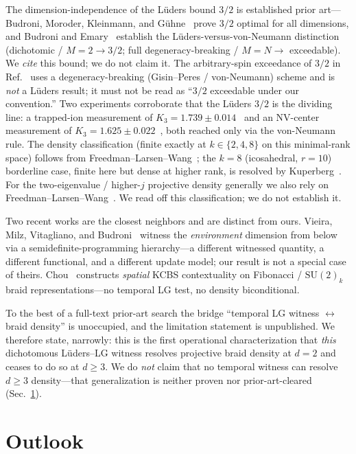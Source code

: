 \documentclass[aps,prx,reprint,amsmath,amssymb,floatfix,nofootinbib,superscriptaddress]{revtex4-2}
\begin{document}
The dimension-independence of the L\"uders bound $3/2$ is established prior
art---Budroni, Moroder, Kleinmann, and G\"uhne~\cite{BMKG} prove $3/2$ optimal for all
dimensions, and Budroni and Emary~\cite{BE} establish the L\"uders-versus-von-Neumann
distinction (dichotomic / $M=2 \to 3/2$; full degeneracy-breaking / $M=N \to$
exceedable). We \emph{cite} this bound; we do not claim it. The arbitrary-spin
exceedance of $3/2$ in Ref.~\cite{MM} uses a degeneracy-breaking (Gisin--Peres /
von-Neumann) scheme and is \emph{not} a L\"uders result; it must not be read as
``$3/2$ exceedable under our convention.'' Two experiments corroborate that the
L\"uders $3/2$ is the dividing line: a trapped-ion measurement of
$K_3 = 1.739 \pm 0.014$~\cite{TrappedIon2023} and an NV-center measurement of
$K_3 = 1.625 \pm 0.022$~\cite{NV2022}, both reached only via the von-Neumann rule. The density
classification (finite exactly at $k \in \{2,4,8\}$ on this minimal-rank space)
follows from Freedman--Larsen--Wang~\cite{FLW}; the $k=8$ (icosahedral, $r=10$)
borderline case, finite here but dense at higher rank, is resolved by
Kuperberg~\cite{Kup}. For the two-eigenvalue / higher-$j$ projective density
generally we also rely on Freedman--Larsen--Wang~\cite{FLW}. We read off this
classification; we do not establish it.

Two recent works are the closest neighbors and are distinct from ours.
Vieira, Milz, Vitagliano, and Budroni~\cite{Vieira} witness the \emph{environment}
dimension from below via a semidefinite-programming hierarchy---a different witnessed
quantity, a different functional, and a different update model; our result is not a
special case of theirs. Chou~\cite{Chou} constructs \emph{spatial} KCBS contextuality
on Fibonacci / $\mathrm{SU}(2)_k$ braid representations---no temporal LG test, no
density biconditional.

To the best of a full-text prior-art search the bridge ``temporal LG witness
$\leftrightarrow$ braid density'' is unoccupied, and the limitation statement is
unpublished. We therefore state, narrowly: this is the first operational
characterization that \emph{this} dichotomous L\"uders--LG witness resolves projective
braid density at $d=2$ and ceases to do so at $d \ge 3$. We do \emph{not} claim that
no temporal witness can resolve $d \ge 3$ density---that generalization is neither
proven nor prior-art-cleared (Sec.~\ref{sec:outlook}).

\section{Outlook}
\label{sec:outlook}
\end{document}
